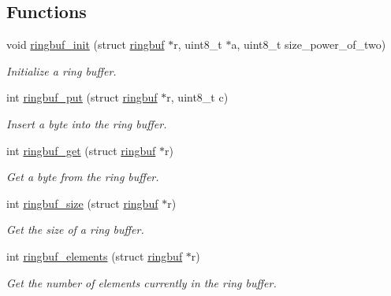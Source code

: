 \subsection*{Functions}
\begin{DoxyCompactItemize}
\item 
void \hyperlink{group__ringbuf_ga5e40b0459813787a4e67fceb0aab5fd6}{ringbuf\-\_\-init} (struct \hyperlink{structringbuf}{ringbuf} $\ast$r, uint8\-\_\-t $\ast$a, uint8\-\_\-t size\-\_\-power\-\_\-of\-\_\-two)
\begin{DoxyCompactList}\small\item\em Initialize a ring buffer. \end{DoxyCompactList}\item 
int \hyperlink{group__ringbuf_ga2a370b54ed5d194e188a94e505b48eeb}{ringbuf\-\_\-put} (struct \hyperlink{structringbuf}{ringbuf} $\ast$r, uint8\-\_\-t c)
\begin{DoxyCompactList}\small\item\em Insert a byte into the ring buffer. \end{DoxyCompactList}\item 
int \hyperlink{group__ringbuf_ga2972cc12c40c75e5c883e831ff8c14ab}{ringbuf\-\_\-get} (struct \hyperlink{structringbuf}{ringbuf} $\ast$r)
\begin{DoxyCompactList}\small\item\em Get a byte from the ring buffer. \end{DoxyCompactList}\item 
int \hyperlink{group__ringbuf_ga0c16200911b10f8137499825b5803b8d}{ringbuf\-\_\-size} (struct \hyperlink{structringbuf}{ringbuf} $\ast$r)
\begin{DoxyCompactList}\small\item\em Get the size of a ring buffer. \end{DoxyCompactList}\item 
int \hyperlink{group__ringbuf_ga8b3f31407ae7e5a98f9cedcb6f5bd82b}{ringbuf\-\_\-elements} (struct \hyperlink{structringbuf}{ringbuf} $\ast$r)
\begin{DoxyCompactList}\small\item\em Get the number of elements currently in the ring buffer. \end{DoxyCompactList}\end{DoxyCompactItemize}

